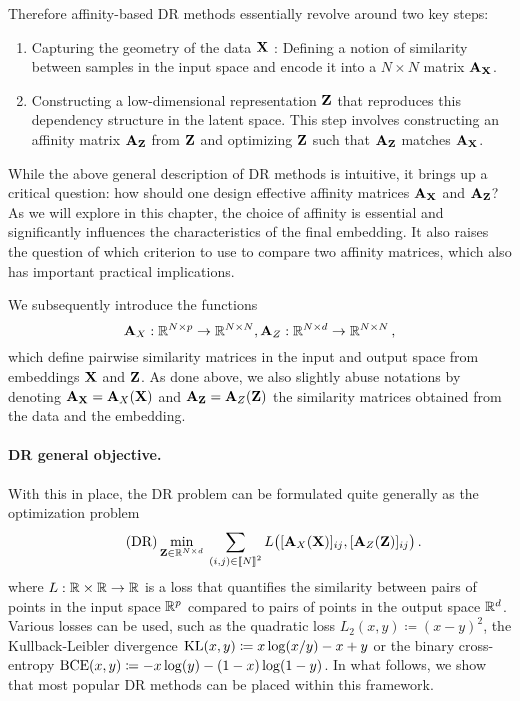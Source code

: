 Therefore affinity-based DR methods essentially revolve around two key steps:

\begin{enumerate}
	\item Capturing the geometry of the data ${\mathbf{X}}$ : Defining a notion of similarity between samples in the input space and encode it into a $N \times N$ matrix ${\mathbf{A}}_{{\mathbf{X}}}$.
	\item Constructing a low-dimensional representation ${\mathbf{Z}}$ that reproduces this dependency structure in the latent space. This step involves constructing an affinity matrix ${\mathbf{A}}_{{\mathbf{Z}}}$ from ${\mathbf{Z}}$ and optimizing ${\mathbf{Z}}$ such that ${\mathbf{A}}_{{\mathbf{Z}}}$ matches ${\mathbf{A}}_{{\mathbf{X}}}$.
\end{enumerate}

While the above general description of DR methods is intuitive, it brings up a critical question: how should one design effective affinity matrices ${\mathbf{A}}_{{\mathbf{X}}}$ and ${\mathbf{A}}_{{\mathbf{Z}}}$? As we will explore in this chapter, the choice of affinity is essential and significantly influences the characteristics of the final embedding. It also raises the question of which criterion to use to compare two affinity matrices, which also has important practical implications.

We subsequently introduce the functions
\begin{equation}
\label{eq:sim_function}
{\mathbf{A}}_{X}: \mathbb{R}^{N \times p} \to \mathbb{R}^{N \times N}, {\mathbf{A}}_{Z}: \mathbb{R}^{N \times d} \to \mathbb{R}^{N \times N}\,,
\end{equation}
which define pairwise similarity matrices in the input and output space from embeddings ${\mathbf{X}}$ and ${\mathbf{Z}}$. As done above, we also slightly abuse notations by denoting ${\mathbf{A}}_{\mathbf{X}} = {\mathbf{A}}_{X}({\mathbf{X}})$ and ${\mathbf{A}}_{\mathbf{Z}} = {\mathbf{A}}_{Z}({\mathbf{Z}})$ the similarity matrices obtained from the data and the embedding.
 
\paragraph{DR general objective.} With this in place, the DR problem can be formulated quite generally as the optimization problem
\begin{equation}
\label{eq:DR_criterion}\tag{DR}
\min_{\mZ \in \R^{N \times d}} \: \sum_{(i,j) \in \integ{N}^2}  L\big([\simiX(\mX)]_{ij}, [\simi(\mZ)]_{ij}\big) \,. %
\end{equation}
where $L:\mathbb{R} \times \mathbb{R} \rightarrow \mathbb{R}$ is a loss that quantifies the similarity between pairs of points in the input space $\mathbb{R}^{p}$ compared to pairs of points in the output space $\mathbb{R}^{d}$. Various losses can be used, such as the quadratic loss $L_2(x,y) \coloneqq (x - y)^2$, the Kullback-Leibler divergence $\operatorname{KL}(x,y) \coloneqq x \log (x/y) - x +y$ or the binary cross-entropy $\operatorname{BCE}(x,y) \coloneqq -x \log(y) - (1-x) \log(1-y)$.
In what follows, we show that most popular DR methods can be placed within this framework.


